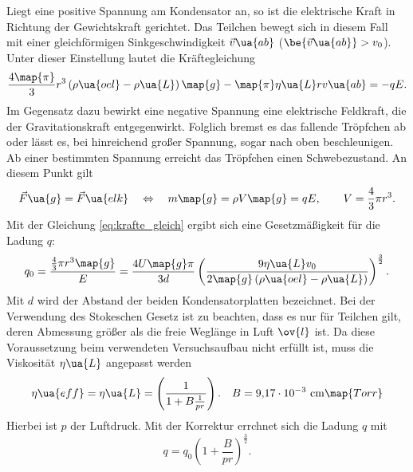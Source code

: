 Liegt eine positive Spannung am Kondensator an, so ist die elektrische Kraft in Richtung der Gewichtskraft gerichtet. %
Das Teilchen bewegt sich in diesem Fall mit einer gleichförmigen Sinkgeschwindigkeit $\vec{v}\ua{ab}$ ($\be{\vec{v}\ua{ab}}>v_0$).
Unter dieser Einstellung lautet die Kräftegleichung
\begin{equation}
  \label{eq:kraefte_eins}
    \frac{4\map{\pi}}{3}r^3\left(\rho\ua{oel}-\rho\ua{L}\right)\map{g}-\map{\pi}\eta\ua{L}r v\ua{ab}=-qE.
\end{equation}
Im Gegensatz dazu bewirkt eine negative Spannung eine elektrische Feldkraft, die der Gravitationskraft
entgegenwirkt. Folglich bremst es das fallende Tröpfchen ab oder
lässt es, bei hinreichend großer Spannung, sogar nach oben beschleunigen. %
Ab einer bestimmten Spannung erreicht das Tröpfchen einen Schwebezustand. An diesem %
Punkt gilt
\begin{equation}
  \label{eq:krafte_gleich}
  \vec{F}\ua{g}=\vec{F}\ua{elk} \quad \Leftrightarrow \quad m\map{g}=\rho V\map{g}=qE, \qquad V=\frac{4}{3}\pi r^3.
\end{equation}
Mit der Gleichung \eqref{eq:krafte_gleich} ergibt sich eine Gesetzmäßigkeit für die Ladung $q$:
\begin{equation}%
  \label{eq:q}
  q_0=\frac{\frac{4}{3}\pi r^3 \map{g}}{E} = \frac{4U\map{g}\pi}{3d}\left( \frac{9\eta\ua{L}v_0}{2\map{g}\left(\rho\ua{oel}-\rho\ua{L}\right)}\right)^{\frac{3}{2}} .
\end{equation}
Mit $d$ wird der Abstand der beiden Kondensatorplatten bezeichnet.%
Bei der Verwendung des Stokeschen Gesetz ist zu beachten, dass es nur für Teilchen gilt,%
deren Abmessung größer als die freie Weglänge in Luft $\ov{l}$ ist. %
Da diese Voraussetzung beim verwendeten Versuchsaufbau nicht erfüllt ist, muss die Viskosität $\eta\ua{L}$ %
angepasst werden %
\begin{equation*}
  \eta\ua{eff}=\eta\ua{L}=\left(\frac{1}{1+B\frac{1}{pr}}\right). \quad B=\SI{9.17e-3}\,\si{\centi\meter}\map{Torr}
\end{equation*}
Hierbei ist $p$ der Luftdruck. Mit der Korrektur errchnet sich die Ladung $q$ mit %
\begin{equation}
  \label{eq:q_korri}
  q=q_0\left(1+\frac{B}{pr}\right)^{\frac{3}{2}}.
\end{equation}
